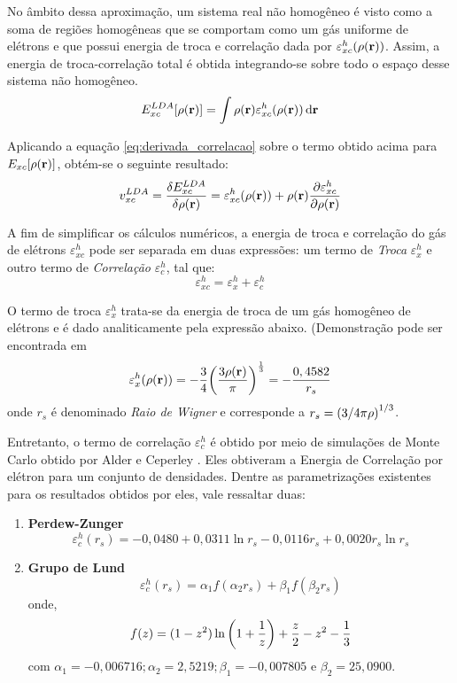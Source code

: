 No âmbito dessa aproximação, um sistema real não homogêneo é visto como a soma de regiões homogêneas que se comportam como um gás uniforme de elétrons e que possui energia de troca e correlação dada por $\varepsilon_{xc}^{h}(\rho(\vb{r})) $. Assim, a energia de troca-correlação total é obtida integrando-se sobre todo o espaço desse sistema não homogêneo.
\begin{equation}
	E^{LDA}_{xc}\bqty{\dens}=\int \dens\varepsilon_{xc}^{h}(\dens)\dr
\end{equation}

Aplicando a equação \eqref{eq:derivada_correlacao} sobre o termo obtido acima para $ E_{xc}\bqty{\dens} $, obtém-se o seguinte resultado:
\begin{equation}
	v_{xc}^{LDA}=\fdv{E^{LDA}_{xc}}{\dens}= \varepsilon_{xc}^{h}(\dens)+\dens\pdv{\varepsilon_{xc}^{h}}{\dens} 
\end{equation}

A fim de simplificar os cálculos numéricos, a energia de troca e correlação do gás de elétrons $ \varepsilon_{xc}^{h} $ pode ser separada em duas expressões: um termo de \textit{Troca} $ \varepsilon_{x}^{h} $ e outro termo de \textit{Correlação} $ \varepsilon_{c}^{h} $, tal que:
\begin{equation}
	\varepsilon_{xc}^{h}=\varepsilon_{x}^{h}+\varepsilon_{c}^{h}
\end{equation}


O termo de troca $ \varepsilon_{x}^{h} $  trata-se da energia de troca de um gás homogêneo de elétrons e é dado analiticamente pela expressão abaixo. (Demonstração pode ser encontrada em \cite{fazio_livro}
\begin{equation}
	\varepsilon_{x}^{h}(\dens)=-\frac{3}{4} \pqty{\frac{3\dens}{\pi}}^{\frac{1}{3}}=-\frac{0,4582}{r_s}
\end{equation}
onde $ r_s $ é denominado \textit{Raio de Wigner} e corresponde a $ r_s=\pqty{3/4\pi\rho}^{1/3} $.

Entretanto, o termo de correlação $ \varepsilon_{c}^{h} $ é obtido por meio de simulações de Monte Carlo obtido por Alder e Ceperley \cite{ceperley}. Eles obtiveram a Energia de Correlação por elétron para um conjunto de densidades. Dentre as parametrizações existentes para os resultados obtidos por eles, vale ressaltar duas:

\begin{enumerate}
	\item \textbf{Perdew-Zunger} \cite{perdew_zunger}
	\begin{equation}
		\varepsilon_{c}^{h}(r_s)=-0,0480+0,0311 \ln r_s-0,0116 r_s+0,0020r_s \ln r_s
	\end{equation}
	\item \textbf{Grupo de Lund} \cite{lund}
	\begin{equation}	\varepsilon_{c}^{h}(r_s)=\alpha_1f(\alpha_2r_s)+\beta_1f(\beta_2r_s) 
	\end{equation}
	onde,
	\begin{equation*}
		f(z)=(1-z^2)\ln\pqty{1+\frac{1}{z}}+\frac{z}{2}-z^2-\frac{1}{3}
	\end{equation*}	
	com $\alpha_1= -0,006716 ; \alpha_2=2,5219 ; \beta_1=-0,007805$ e $\beta_2=25,0900$.
\end{enumerate}


